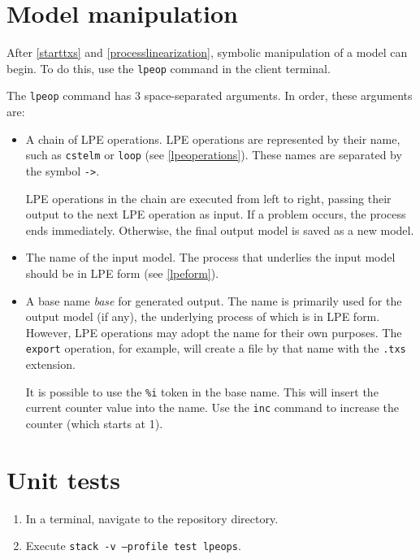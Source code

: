 \section{Model manipulation} \label{modelmanipulation}

After \ref{starttxs} and \ref{processlinearization}, symbolic manipulation of a \txs{} model can begin.
To do this, use the \texttt{lpeop} command in the client terminal.

The \texttt{lpeop} command has 3 space-separated arguments. In order, these arguments are:

\begin{itemize}
\item A chain of LPE operations.
LPE operations are represented by their name, such as \texttt{cstelm} or \texttt{loop} (see \ref{lpeoperations}).
These names are separated by the symbol \texttt{->}.

LPE operations in the chain are executed from left to right, passing their output to the next LPE operation as input.
If a problem occurs, the process ends immediately.
Otherwise, the final output model is saved as a new model.
\item The name of the input model.
The process that underlies the input model should be in LPE form (see \ref{lpeform}).
\item A base name \textit{base} for generated output.
The name is primarily used for the output model (if any), the underlying process of which is in LPE form.
However, LPE operations may adopt the name for their own purposes.
The \texttt{export} operation, for example, will create a file by that name with the \texttt{.txs} extension.

It is possible to use the \texttt{\%i} token in the base name.
This will insert the current counter value into the name.
Use the \texttt{inc} command to increase the counter (which starts at 1).
\end{itemize}

\section{Unit tests}

\begin{enumerate}
\item In a terminal, navigate to the repository directory.
\item Execute \texttt{stack -v --profile test lpeops}.
\end{enumerate}

